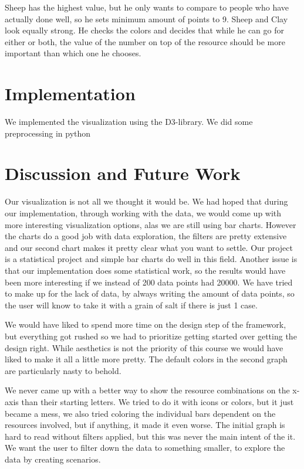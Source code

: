 \documentclass[journal]{vgtc}                %
\begin{document}
Sheep has the highest value, but he only wants to compare to people who have
actually done well, so he sets minimum amount of points to 9. Sheep and Clay
look equally strong. He checks the colors and decides that while he can go for
either or both, the value of the number on top of the resource should be more
important than which one he chooses. 

\section{Implementation}

We implemented the visualization using the D3-library. We did some
preprocessing in python 



\section{Discussion and Future Work}

Our visualization is not all we thought it would be. We had hoped that during
our implementation, through working with the data, we would come up with
more interesting visualization options, alas we are still using bar charts.
However the charts do a good job with data exploration, the filters are pretty
extensive and our second chart makes it pretty clear what you want to settle.
Our project is a statistical project and simple bar charts do well in this
field. Another issue is that our implementation does some statistical work,
so the results would have been more interesting if we instead of 200 data
points had 20000. We have tried to make up for the lack of data, by always
writing the amount of data points, so the user will know to take it with a
grain of salt if there is just 1 case.

We would have liked to spend more time on the design step of the framework,
but everything got rushed so we had to prioritize getting started over getting
the design right. While aesthetics is not the priority of this course we would
have liked to make it all a little more pretty. The default colors in the
second graph are particularly nasty to behold. 

We never came up with a better way to show the resource combinations on
the x-axis than their starting letters. We tried to do it with icons or
colors, but it just became a mess, we also tried coloring the individual
bars dependent on the resources involved, but if anything, it made it even
worse. The initial graph is hard to read without filters applied, but this was
never the main intent of the it. We want the user to filter down the data to
something smaller, to explore the data by creating scenarios. 
\end{document}
